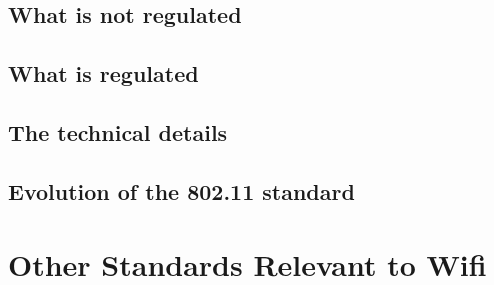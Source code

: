 \subsection{What is not regulated}

\subsection{What is regulated}

\subsection{The technical details}

\subsection{Evolution of the 802.11 standard}

\section{Other Standards Relevant to Wifi}
